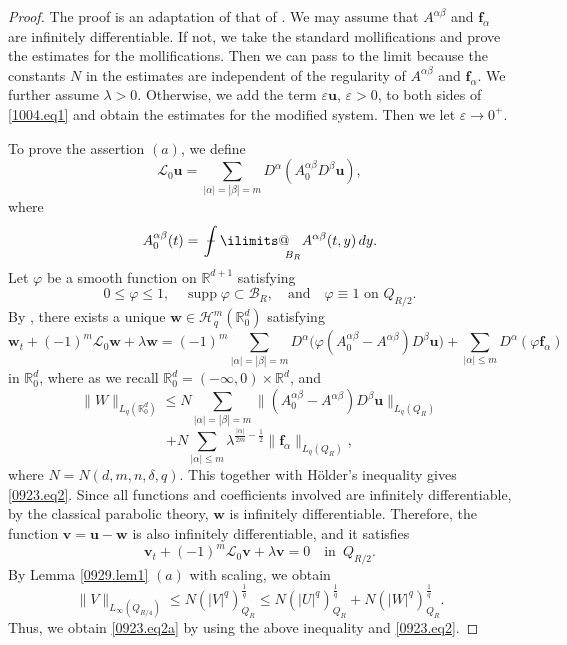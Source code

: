 \documentclass[reqno]{amsart}
\numberwithin{equation}{section}
\theoremstyle{plain}
\theoremstyle{definition}
\theoremstyle{remark}
\begin{document}
\begin{proof}
The proof is an adaptation of that of \cite[Lemma 8.3]{MR2835999}.
We may assume that $A^{\alpha\beta}$ and ${\boldsymbol{f}}_\alpha$ are infinitely differentiable.
If not, we take the standard mollifications and prove the estimates for the mollifications.
Then we can pass to the limit because the constants $N$ in the estimates are independent of the regularity of $A^{\alpha\beta}$ and ${\boldsymbol{f}}_\alpha$.
We further assume $\lambda>0$.
Otherwise, we add the term $\varepsilon {\boldsymbol{u}}$, $\varepsilon>0$, to both sides of \eqref{1004.eq1} and obtain the estimates for the modified system.
Then we let $\varepsilon \to 0^+$.

To prove the assertion $(a)$, we define 
\[
{\mathcal{L}}_0{\boldsymbol{u}}=\sum_{|\alpha|=|\beta|=m}D^\alpha(A^{\alpha\beta}_0D^\beta {\boldsymbol{u}}), 
\]
where 
\[
A^{\alpha\beta}_0(t)={\operatorname{\,\,\text{\bf--}\kern-.98em\DOTSI\intop\ilimits@\!\!}}_{B_R}A^{\alpha\beta}(t,y)\,dy.
\]
Let $\varphi$ be a smooth function on ${\mathbb{R}}^{d+1}$ satisfying
$$
0\le \varphi\le 1, \quad \operatorname{supp} \varphi\subset {\mathcal{B}}_R, \quad \text{and}\quad \varphi\equiv 1\text{ on } Q_{R/2}.
$$
By \cite[Theorem 1]{MR2771670}, there exists a unique ${\boldsymbol{w}}\in {\mathcal{H}}^m_q({\mathbb{R}}^d_{0})$ satisfying
$$
{\boldsymbol{w}}_t+(-1)^m{\mathcal{L}}_0 {\boldsymbol{w}}+\lambda {\boldsymbol{w}}=(-1)^m\sum_{|\alpha|=|\beta|=m}D^\alpha\big(\varphi(A^{\alpha\beta}_0-A^{\alpha\beta})D^\beta {\boldsymbol{u}}\big)+\sum_{|\alpha| \le m}D^\alpha(\varphi {\boldsymbol{f}}_\alpha)
$$
in $ {\mathbb{R}}^d_0$, where as we recall ${\mathbb{R}}^d_0 = (-\infty,0) \times {\mathbb{R}}^d$, and 
$$		
\|W\|_{L_q({\mathbb{R}}^d_0)}\le N\sum_{|\alpha|=|\beta|=m}\|(A^{\alpha\beta}_0-A^{\alpha\beta})D^\beta{\boldsymbol{u}}\|_{L_q(Q_R)}
$$
$$
+N\sum_{|\alpha| \le m}\lambda^{\frac{|\alpha|}{2m}-\frac{1}{2}}\|{\boldsymbol{f}}_\alpha\|_{L_q(Q_R)},
$$
where $N=N(d,m,n,\delta,q)$.
This together with H\"older's inequality gives \eqref{0923.eq2}.
Since all functions and coefficients involved are infinitely differentiable, by the classical parabolic theory, ${\boldsymbol{w}}$ is infinitely differentiable.
Therefore, the function   ${\boldsymbol{v}}={\boldsymbol{u}}-{\boldsymbol{w}}$ is also infinitely differentiable, and it satisfies 
\[
{\boldsymbol{v}}_t+(-1)^m{\mathcal{L}}_0 {\boldsymbol{v}}+\lambda {\boldsymbol{v}}=0 \quad \text{in }\, Q_{R/2}.
\]
By Lemma \ref{0929.lem1} $(a)$ with scaling,  we obtain  
\begin{equation*}	
\|V\|_{L_\infty(Q_{R/4})}\le N(|V|^q)^{\frac{1}{q}}_{Q_R}\le N(|U|^q)^{\frac{1}{q}}_{Q_R}+N(|W|^q)^{\frac{1}{q}}_{Q_R}.
\end{equation*}
Thus, we obtain \eqref{0923.eq2a} by using the above inequality and \eqref{0923.eq2}.


\end{proof}
\end{document}
